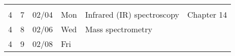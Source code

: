 \begin{longtable}[]{@{}llllll@{}}
\begin{minipage}[t]{0.17\columnwidth}
\strut
\end{minipage}\tabularnewline
\begin{minipage}[t]{0.03\columnwidth}\raggedright
4\strut
\end{minipage} & \begin{minipage}[t]{0.03\columnwidth}\raggedright
7\strut
\end{minipage} & \begin{minipage}[t]{0.06\columnwidth}\raggedright
02/04\strut
\end{minipage} & \begin{minipage}[t]{0.04\columnwidth}\raggedright
Mon\strut
\end{minipage} & \begin{minipage}[t]{0.49\columnwidth}\raggedright
Infrared (IR) spectroscopy\strut
\end{minipage} & \begin{minipage}[t]{0.17\columnwidth}\raggedright
Chapter 14\strut
\end{minipage}\tabularnewline
\begin{minipage}[t]{0.03\columnwidth}\raggedright
4\strut
\end{minipage} & \begin{minipage}[t]{0.03\columnwidth}\raggedright
8\strut
\end{minipage} & \begin{minipage}[t]{0.06\columnwidth}\raggedright
02/06\strut
\end{minipage} & \begin{minipage}[t]{0.04\columnwidth}\raggedright
Wed\strut
\end{minipage} & \begin{minipage}[t]{0.49\columnwidth}\raggedright
Mass spectrometry\strut
\end{minipage} & \begin{minipage}[t]{0.17\columnwidth}\raggedright
\strut
\end{minipage}\tabularnewline
\begin{minipage}[t]{0.03\columnwidth}\raggedright
4\strut
\end{minipage} & \begin{minipage}[t]{0.03\columnwidth}\raggedright
9\strut
\end{minipage} & \begin{minipage}[t]{0.06\columnwidth}\raggedright
02/08\strut
\end{minipage} & \begin{minipage}[t]{0.04\columnwidth}\raggedright
Fri\strut
\end{minipage} & \begin{minipage}[t]{0.49\columnwidth}\raggedright

\end{minipage}
\end{longtable}
